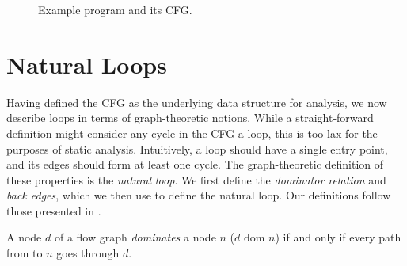 \begin{figure}
\begin{subfigure}{.58\linewidth}
\end{subfigure}
\hfill
\begin{subfigure}{.38\linewidth}
\end{subfigure}
    \caption{Example program and its CFG.}
    \label{fig:example_program_cfg}
\end{figure}

\section{Natural Loops}

Having defined the CFG as the underlying data structure for analysis, we now describe loops in terms of graph-theoretic notions. While a straight-forward definition might consider any cycle in the CFG a loop, this is too lax for the purposes of static analysis. Intuitively, a loop should have a single entry point, and its edges should form at least one cycle. The graph-theoretic definition of these properties is the \emph{natural loop}. We first define the \emph{dominator relation} and \emph{back edges}, which we then use to define the natural loop. Our definitions follow those presented in \cite{DBLP:books/aw/AhoSU86}.

\begin{definition}
    A node $d$ of a flow graph \emph{dominates} a node $n$ ($d \text{ dom }n$) if and only if every path from \entry{} to $n$ goes through $d$.
\end{definition}

